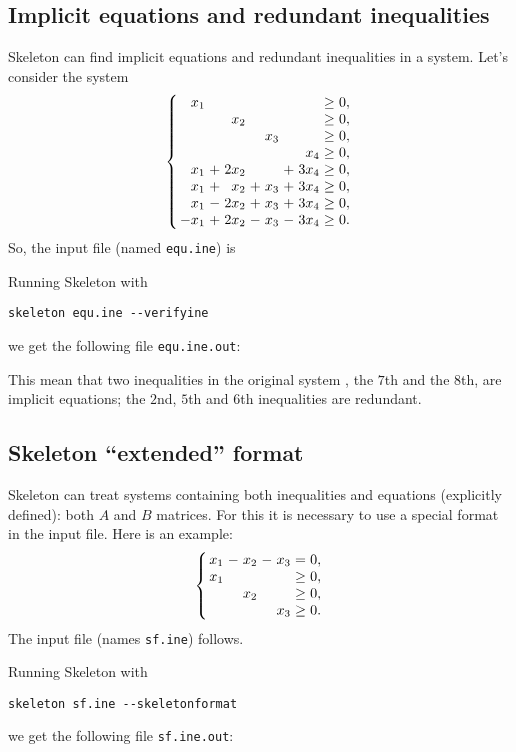 \documentclass{article}
\newcommand{\Skeleton}{{\sc Skeleton}\xspace}
\newenvironment{narrowarray}[1]{\arraycolsep=0.15em\begin{array}{#1}}{\end{array}}
\begin{document}
\subsection{Implicit equations and redundant inequalities}

\Skeleton can find implicit equations and redundant inequalities in a system.
Let's consider the system
$$
\left\{
\begin{narrowarray}{rcrcrcrcr}
 x_1 &   &      &   &     &   &       &  \ge & 0, \\
     &   &  x_2 &   &     &   &       &  \ge & 0, \\
     &   &      &   & x_3 &   &       &  \ge & 0, \\
     &   &      &   &     &   &  x_4  &  \ge & 0, \\
 x_1 &  +& 2x_2 &   &     &  +& 3x_4  &  \ge & 0, \\
 x_1 &  +&  x_2 &  +& x_3 &  +& 3x_4  &  \ge & 0, \\
 x_1 &  -& 2x_2 &  +& x_3 &  +& 3x_4  &  \ge & 0, \\
-x_1 &  +& 2x_2 &  -& x_3 &  -& 3x_4  &  \ge & 0. \\
\end{narrowarray}
\right.
$$
So, the input file (named \verb$equ.ine$) is


Running \Skeleton with
\begin{verbatim}
skeleton equ.ine --verifyine
\end{verbatim}
we get the following file \verb$equ.ine.out$:


This mean that two inequalities in the original system , the $7$th and the $8$th, are implicit equations;
the $2$nd, $5$th and $6$th inequalities are redundant.

\subsection{Skeleton ``extended'' format}

\Skeleton can treat systems containing both inequalities and equations (explicitly defined):
both $A$ and $B$ matrices. For this it is necessary to use a special format in the input file. 
Here is an example:
$$
\left\{
\begin{narrowarray}{rcrcrcrcr}
 x_1 &  -&  x_2 &  -& x_3 &  =  & 0, \\
 x_1 &   &      &   &     & \ge & 0, \\
     &   &  x_2 &   &     & \ge & 0, \\
     &   &      &   & x_3 & \ge & 0. \\
\end{narrowarray}
\right.
$$
The input file (names \verb$sf.ine$) follows. 

Running \Skeleton with
\begin{verbatim}
skeleton sf.ine --skeletonformat
\end{verbatim}
we get the following file \verb$sf.ine.out$:

\end{document}

